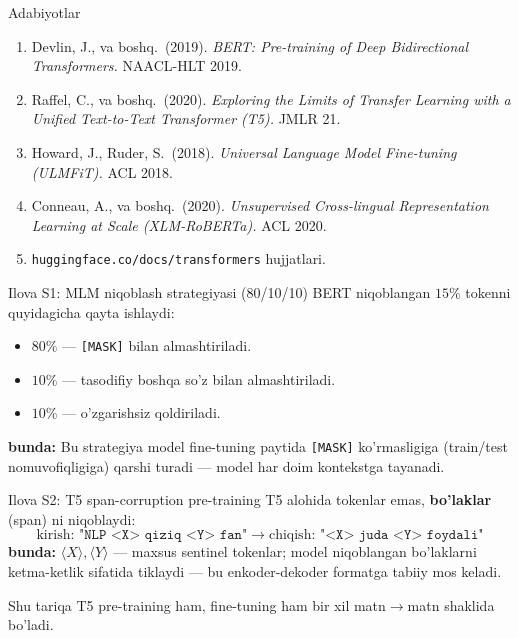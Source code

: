 \documentclass[aspectratio=169,11pt]{beamer}
\newcommand{\bunda}[1]{{\small\textbf{bunda:}\; #1}}
\begin{document}
\begin{frame}{Adabiyotlar}
  \begin{enumerate}\small\setlength\itemsep{5pt}
    \item Devlin, J., va boshq.\ (2019). \textit{BERT: Pre-training of Deep
          Bidirectional Transformers.} NAACL-HLT 2019.
    \item Raffel, C., va boshq.\ (2020). \textit{Exploring the Limits of Transfer
          Learning with a Unified Text-to-Text Transformer (T5).} JMLR 21.
    \item Howard, J., Ruder, S.\ (2018). \textit{Universal Language Model
          Fine-tuning (ULMFiT).} ACL 2018.
    \item Conneau, A., va boshq.\ (2020). \textit{Unsupervised Cross-lingual
          Representation Learning at Scale (XLM-RoBERTa).} ACL 2020.
    \item \texttt{huggingface.co/docs/transformers} hujjatlari.
  \end{enumerate}
\end{frame}

\appendix

\begin{frame}{Ilova S1: MLM niqoblash strategiyasi (80/10/10)}
  \small
  BERT niqoblangan $15\%$ tokenni quyidagicha qayta ishlaydi:
  \begin{itemize}\setlength\itemsep{2pt}
    \item $80\%$ --- \texttt{[MASK]} bilan almashtiriladi.
    \item $10\%$ --- tasodifiy boshqa so'z bilan almashtiriladi.
    \item $10\%$ --- o'zgarishsiz qoldiriladi.
  \end{itemize}
  \bunda{Bu strategiya model fine-tuning paytida \texttt{[MASK]} ko'rmasligiga
  (train/test nomuvofiqligiga) qarshi turadi --- model har doim kontekstga tayanadi.}
\end{frame}

\begin{frame}{Ilova S2: T5 span-corruption pre-training}
  \small
  T5 alohida tokenlar emas, \textbf{bo'laklar} (span) ni niqoblaydi:
  $$ \text{kirish: } \texttt{"NLP <X> qiziq <Y> fan"} \;\to\;
     \text{chiqish: } \texttt{"<X> juda <Y> foydali"} $$
  \bunda{$\langle X\rangle, \langle Y\rangle$ --- maxsus sentinel tokenlar; model
  niqoblangan bo'laklarni ketma-ketlik sifatida tiklaydi --- bu enkoder-dekoder
  formatga tabiiy mos keladi.}
  \vspace{4pt}

  Shu tariqa T5 pre-training ham, fine-tuning ham bir xil matn$\to$matn shaklida bo'ladi.
\end{frame}
\end{document}

